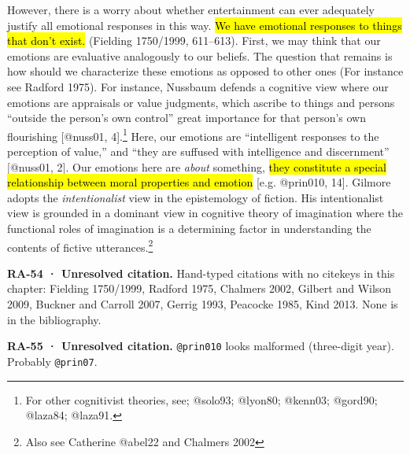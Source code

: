 \documentclass[
  letterpaper,
  DIV=11,
  numbers=noendperiod]{scrartcl}
\theoremstyle{remark}
\begin{document}
However, there is a worry about whether entertainment can ever
adequately justify all emotional responses in this way. \hl{We have
emotional responses to things that don't exist.} (Fielding 1750/1999,
611--613). First, we may think that our emotions are evaluative
analogously to our beliefs. The question that remains is how should we
characterize these emotions as opposed to other ones (For instance see
Radford 1975). For instance, Nussbaum defends a cognitive view where our
emotions are appraisals or value judgments, which ascribe to things and
persons ``outside the person's own control'' great importance for that
person's own flourishing {[}@nuss01, 4{]}.\footnote{For other
  cognitivist theories, see; @solo93; @lyon80; @kenn03; @gord90;
  @laza84; @laza91.} Here, our emotions are ``intelligent responses to
the perception of value,'' and ``they are suffused with intelligence and
discernment'' {[}@nuss01, 2{]}. Our emotions here are \emph{about}
something, \hl{they constitute a special relationship between moral
properties and emotion} {[}e.g. @prin010, 14{]}. Gilmore adopts the
\emph{intentionalist} view in the epistemology of fiction. His
intentionalist view is grounded in a dominant view in cognitive theory
of imagination where the functional roles of imagination is a
determining factor in understanding the contents of fictive
utterances.\footnote{Also see Catherine @abel22 and Chalmers 2002}

\begin{tcolorbox}[enhanced jigsaw, arc=.35mm, bottomrule=.15mm, bottomtitle=1mm, breakable, colback=white, colbacktitle=quarto-callout-warning-color!10!white, colframe=quarto-callout-warning-color-frame, coltitle=black, left=2mm, leftrule=.75mm, opacityback=0, opacitybacktitle=0.6, rightrule=.15mm, title=\textcolor{quarto-callout-warning-color}{\faExclamationTriangle}\hspace{0.5em}{Warning}, titlerule=0mm, toprule=.15mm, toptitle=1mm]

\textbf{RA-54 · Unresolved citation.} Hand-typed citations with no
citekeys in this chapter: Fielding 1750/1999, Radford 1975, Chalmers
2002, Gilbert and Wilson 2009, Buckner and Carroll 2007, Gerrig 1993,
Peacocke 1985, Kind 2013. None is in the bibliography.

\end{tcolorbox}

\begin{tcolorbox}[enhanced jigsaw, arc=.35mm, bottomrule=.15mm, bottomtitle=1mm, breakable, colback=white, colbacktitle=quarto-callout-warning-color!10!white, colframe=quarto-callout-warning-color-frame, coltitle=black, left=2mm, leftrule=.75mm, opacityback=0, opacitybacktitle=0.6, rightrule=.15mm, title=\textcolor{quarto-callout-warning-color}{\faExclamationTriangle}\hspace{0.5em}{Warning}, titlerule=0mm, toprule=.15mm, toptitle=1mm]

\textbf{RA-55 · Unresolved citation.} \texttt{@prin010} looks malformed
(three-digit year). Probably \texttt{@prin07}.

\end{tcolorbox}
\end{document}
